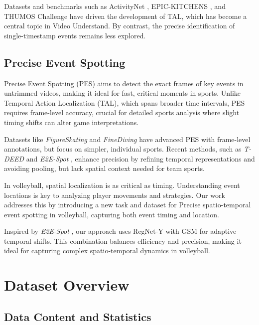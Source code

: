 \documentclass[conference]{IEEEtran}
\begin{document}
Datasets and benchmarks such as ActivityNet \cite{ActivityNet}, EPIC-KITCHENS \cite{damen2018scalingegocentricvisionepickitchens}, and THUMOS Challenge \cite{Idrees_2017} have driven the development of TAL, which has become a central topic in Video Understand. By contrast, the precise identification of single-timestamp events remains less explored.

\subsection{Precise Event Spotting}

Precise Event Spotting (PES) aims to detect the exact frames of key events in untrimmed videos, making it ideal for fast, critical moments in sports. Unlike Temporal Action Localization (TAL), which spans broader time intervals, PES requires frame-level accuracy, crucial for detailed sports analysis where slight timing shifts can alter game interpretations.

Datasets like \textit{FigureSkating} \cite{figureskating} and \textit{FineDiving} \cite{finediving} have advanced PES with frame-level annotations, but focus on simpler, individual sports. Recent methods, such as \textit{T-DEED} \cite{tdeed23} and \textit{E2E-Spot} \cite{spot22}, enhance precision by refining temporal representations and avoiding pooling, but lack spatial context needed for team sports.

In volleyball, spatial localization is as critical as timing. Understanding event locations is key to analyzing player movements and strategies. Our work addresses this by introducing a new task and dataset for Precise spatio-temporal event spotting in volleyball, capturing both event timing and location.

Inspired by \textit{E2E-Spot} \cite{spot22}, our approach uses RegNet-Y \cite{radosavovic2020designingnetworkdesignspaces} with GSM \cite{9156729} for adaptive temporal shifts. This combination balances efficiency and precision, making it ideal for capturing complex spatio-temporal dynamics in volleyball.

\section{Dataset Overview}

\subsection{Data Content and Statistics}
\end{document}
